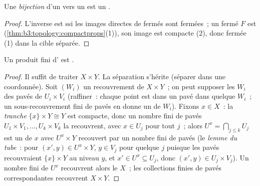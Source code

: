 \begin{corollary}\label{cor:b3:topology:compacthomeo}
Une \emph{bijection}  d'un  vers un
 est un .
\end{corollary}

\begin{proof}
L'inverse est  ssi les images directes de fermés sont
fermées~; un fermé $F$ est 
(\cref{thm:b3:topology:compactprops}(1)), son image est
compacte (2), donc fermée (1) dans la cible séparée.
\end{proof}

\begin{theorem}\label{thm:b3:topology:tychonoff}
Un produit fini d' est .
\end{theorem}

\begin{proof}
Il suffit de traiter $X \times Y$. La séparation s'hérite
(séparer dans une coordonnée). Soit $(W_i)$ un recouvrement
 de $X \times Y$~; on peut supposer les $W_i$ des pavés
de  $U_i \times V_i$ (raffiner~: chaque point est dans un
pavé  dans quelque $W_i$~; un sous-recouvrement fini de
pavés en donne un de $W_i$). Fixons $x \in X$~: la
\emph{tranche} $\{x\}\times Y \cong Y$ est compacte, donc un
nombre fini de pavés $U_1\times V_1, \dots, U_k\times V_k$ la
recouvrent, avec $x \in U_j$ pour tout $j$~; alors $U^x =
\bigcap_{j \leq k} U_j$ est un   de $x$ avec
$U^x \times Y$ recouvert par un nombre fini de pavés (le
\emph{lemme du tube}~: pour $(x', y) \in
U^x \times Y$, $y \in V_j$ pour quelque $j$ puisque les pavés
recouvraient $\{x\}\times Y$ au niveau $y$, et $x' \in U^x
\subseteq U_j$, donc $(x', y) \in U_j \times V_j$). Un nombre
fini de $U^x$ recouvrent alors le  $X$~; les
collections finies de pavés correspondantes recouvrent $X
\times Y$.
\end{proof}

